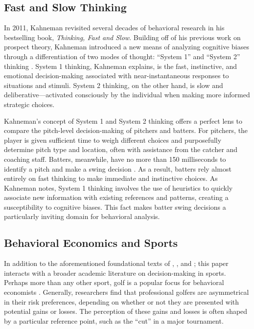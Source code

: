 \documentclass[12pt]{article}
\numberwithin{equation}{section}
\begin{document}
\subsection{Fast and Slow Thinking}

In 2011, Kahneman revisited several decades of behavioral research in his bestselling book, \textit{Thinking, Fast and Slow}. Building off of his previous work on prospect theory, Kahneman introduced a new means of analyzing cognitive biases through a differentiation of two modes of thought: “System 1” and “System 2” thinking \parencite{Kahneman11}. System 1 thinking, Kahneman explains, is the fast, instinctive, and emotional decision-making associated with near-instantaneous responses to situations and stimuli. System 2 thinking, on the other hand, is slow and deliberative---activated consciously by the individual when making more informed strategic choices.

\vspace{5mm} %

Kahneman’s concept of System 1 and System 2 thinking offers a perfect lens to compare the pitch-level decision-making of pitchers and batters. For pitchers, the player is given sufficient time to weigh different choices and purposefully determine pitch type and location, often with assistance from the catcher and coaching staff. Batters, meanwhile, have no more than 150 milliseconds to identify a pitch and make a swing decision \parencite{Quinton17}. As a result, batters rely almost entirely on fast thinking to make immediate and instinctive choices. As Kahneman notes, System 1 thinking involves the use of heuristics to quickly associate new information with existing references and patterns, creating a susceptibility to cognitive biases. This fact makes batter swing decisions a particularly inviting domain for behavioral analysis.

\subsection{Behavioral Economics and Sports}

In addition to the aforementioned foundational texts of \textcite{simon_behavioral_1955}, \textcite{kahneman_psychology_1973, kahneman_prospect_1979}, and \textcite{thaler_toward_1980}; this paper interacts with a broader academic literature on decision-making in sports. Perhaps more than any other sport, golf is a popular focus for behavioral economists \parencite{sachau_birdie_2012, elmore_loss_2021}. Generally, researchers find that professional golfers are asymmetrical in their risk preferences, depending on whether or not they are presented with potential gains or losses. The perception of these gains and losses is often shaped by a particular reference point, such as the “cut” in a major tournament. 
\end{document}
